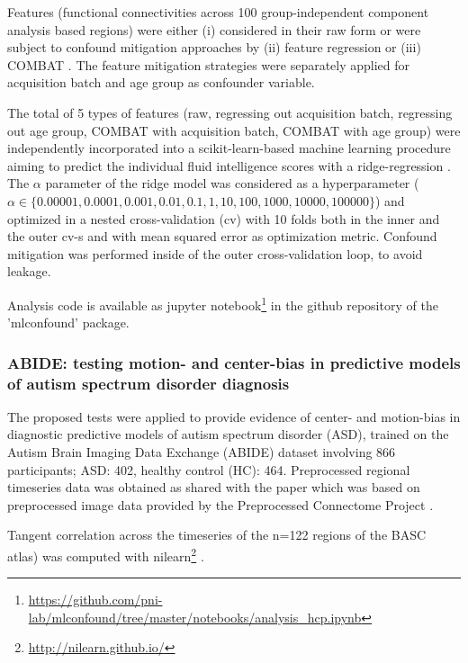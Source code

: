 \documentclass{article}
\begin{document}
Features (functional connectivities across 100 group-independent component analysis based regions) were either (i) considered in their raw form or were subject to confound mitigation approaches by (ii) feature regression \citep{rao2017predictive} or (iii) COMBAT \citep{johnson2007adjusting, fortin2018harmonization}.
The feature mitigation strategies were separately applied for acquisition batch and age group as confounder variable.

The total of 5 types of features (raw, regressing out acquisition batch, regressing out age group, COMBAT with acquisition batch, COMBAT with age group) were independently incorporated into a scikit-learn-based \citep{pedregosa2011scikit} machine learning procedure aiming to predict the individual fluid intelligence scores with a ridge-regression \citep{hoerl1970ridge}. The $\alpha$ parameter of the ridge model was considered as a hyperparameter ($\alpha \in \{0.00001, 0.0001, 0.001, 0.01, 0.1, 1, 10, 100, 1000, 10000, 100000\}$) and optimized in a nested cross-validation (cv) with 10 folds both in the inner and the outer cv-s and with mean squared error as optimization metric. Confound mitigation was performed inside of the outer cross-validation loop, to avoid leakage.

Analysis code is available as jupyter notebook\footnote{\href{https://github.com/pni-lab/mlconfound/tree/master/notebooks/analysis\_hcp.ipynb}{https://github.com/pni-lab/mlconfound/tree/master/notebooks/analysis\_hcp.ipynb}} in the github repository of the 'mlconfound' package.


\subsubsection*{ABIDE: testing motion- and center-bias in predictive models of autism spectrum disorder diagnosis}

The proposed tests were applied to provide evidence of center- and  motion-bias in diagnostic predictive models of autism spectrum disorder (ASD), trained on the Autism Brain Imaging Data Exchange (ABIDE) dataset \citep{di2014autism} involving 866 participants; ASD: 402, healthy control (HC): 464. Preprocessed regional timeseries data was obtained as shared with the paper \citep{dadi2019benchmarking} which was based on preprocessed image data provided by the Preprocessed Connectome Project \citep{craddock2013neuro}.

Tangent correlation across the timeseries of the n=122 regions of the BASC \citep{bellec2010multi} atlas) was computed with nilearn\footnote{\href{http://nilearn.github.io/}{http://nilearn.github.io/}} \citep{huntenburg2017loading, esteve2015big}. 
\end{document}
